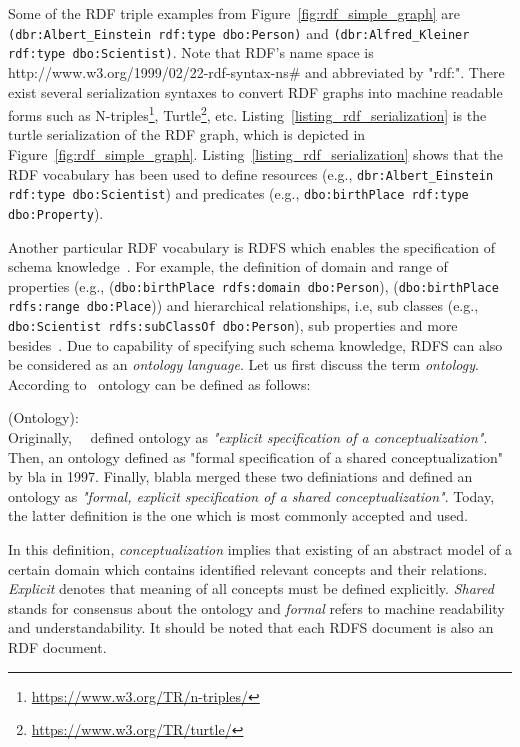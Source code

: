 Some of the RDF triple examples from Figure~\ref{fig:rdf_simple_graph} are \texttt{(dbr:Albert\_Einstein rdf:type dbo:Person)} and \texttt{(dbr:Alfred\_Kleiner rdf:type dbo:Scientist)}. Note that RDF's name space is \\http://www.w3.org/1999/02/22-rdf-syntax-ns\# and abbreviated by "rdf:". There exist several serialization syntaxes to convert RDF graphs into machine readable forms such as N-triples\footnote{\url{https://www.w3.org/TR/n-triples/}}, Turtle\footnote{\url{https://www.w3.org/TR/turtle/}}, etc. Listing~\ref{listing_rdf_serialization} is the turtle serialization of the RDF graph, which is depicted in Figure~\ref{fig:rdf_simple_graph}.  Listing~\ref{listing_rdf_serialization} shows that the RDF vocabulary has been used to define resources (e.g., \texttt{dbr:Albert\_Einstein rdf:type dbo:Scientist}) and predicates (e.g., \texttt{dbo:birthPlace rdf:type dbo:Property}).


\par Another particular RDF vocabulary is RDFS which enables the specification of schema knowledge~\cite{DBLP:books/crc/Hitzler2010}.  For example, the definition of domain and range of properties (e.g., (\texttt{dbo:birthPlace rdfs:domain dbo:Person}), (\texttt{dbo:birthPlace rdfs:range dbo:Place})) and hierarchical relationships, i.e, sub classes (e.g., \texttt{dbo:Scientist rdfs:subClassOf dbo:Person}), sub properties and more besides~\cite{DBLP:books/crc/Hitzler2010}. Due to capability of specifying such schema knowledge, RDFS can also be considered as an \textit{ontology language}. Let us first discuss the term \textit{ontology}. According to~\citeauthor{gruber1993translation} ontology can be defined as follows:
\begin{definition}{(Ontology):\\}
Originally,~\citeauthor{gruber1993translation}~\citeyear{gruber1993translation} defined ontology as \textit{"explicit specification of a conceptualization"}. Then, an ontology defined as "formal specification of a shared conceptualization" by bla in 1997. Finally, blabla merged these two definiations and defined an ontology as \textit{"formal, explicit specification of a shared conceptualization"}. Today, the latter definition is the one which is most commonly accepted and used.
\end{definition}
In this definition, \textit{conceptualization} implies that existing of an abstract model of a certain domain which contains identified relevant concepts and their relations. \textit{Explicit} denotes that meaning of all concepts must be defined explicitly. \textit{Shared} stands for consensus about the ontology and \textit{formal} refers to machine readability and understandability. It should be noted that each RDFS document is also an RDF document.

